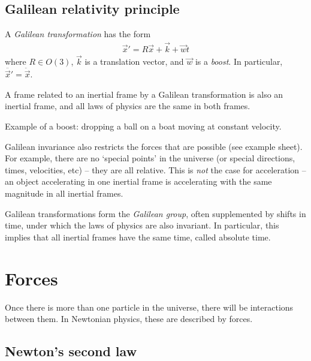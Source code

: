 \documentclass{../template/note}
\begin{document}
    \subsection{Galilean relativity principle}
    
    \begin{definition}
        A \emph{Galilean transformation} has the form
        \begin{align*}
            \vec x' = R \vec x + \vec k + \vec w t
        \end{align*}
        where \(R \in O(3)\), \(\vec k\) is a translation vector, and \(\vec w\) is a \emph{boost}. In particular, \(\ddot{\vec x'} = \ddot{\vec x}\).
    \end{definition}

    \begin{proposition}
        A frame related to an inertial frame by a Galilean transformation is also an inertial frame, and all laws of physics are the same in both frames.
    \end{proposition}
    
    Example of a boost: dropping a ball on a boat moving at constant velocity.

    Galilean invariance also restricts the forces that are possible (see example sheet). For example, there are no `special points' in the universe (or special directions, times, velocities, etc) -- they are all relative. This is \emph{not} the case for acceleration -- an object accelerating in one inertial frame is accelerating with the same magnitude in all inertial frames.

    Galilean transformations form the \emph{Galilean group}, often supplemented by shifts in time, under which the laws of physics are also invariant. In particular, this implies that all inertial frames have the same time, called absolute time.

    \section{Forces}

    Once there is more than one particle in the universe, there will be interactions between them. In Newtonian physics, these are described by forces.

    \subsection{Newton's second law}
\end{document}
